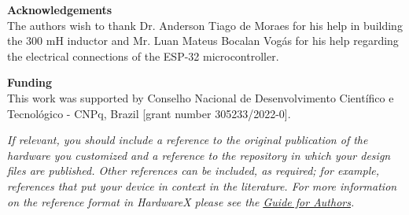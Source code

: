 \documentclass[11pt, letterpaper]{article}
\begin{document}
\noindent
\textbf{Acknowledgements}\\

The authors wish to thank Dr. Anderson Tiago de Moraes for his help in building the $300$ mH inductor and Mr. Luan Mateus Bocalan Vogás for his help regarding the electrical connections of the ESP-32 microcontroller.


\noindent
\textbf{Funding}\\

This work was supported by Conselho Nacional de Desenvolvimento Científico e Tecnológico - CNPq, Brazil [grant number 305233/2022-0].
\vskip 0.2cm


%
\printbibliography{}

\textit{If relevant, you should include a reference to the original publication of the hardware you customized and a reference to the repository in which your design files are published.  Other references can be included, as required; for example, references that put your device in context in the literature. For more information on the reference format in HardwareX please see the \href{https://www.elsevier.com/journals/hardwarex/2468-0672/guide-for-authors}{\underline{Guide for Authors}}.}

\end{document}
